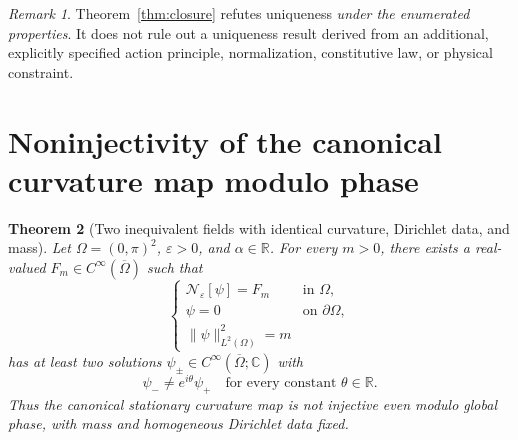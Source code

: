 \documentclass[11pt]{article}
\newtheorem{theorem}{Theorem}[section]
\theoremstyle{remark}
\newtheorem{remark}[theorem]{Remark}
\newcommand{\Ncurv}{\mathcal{N}_{\varepsilon}}
\newcommand{\R}{\mathbb{R}}
\newcommand{\C}{\mathbb{C}}
\begin{document}
\begin{remark}
Theorem~\ref{thm:closure} refutes uniqueness \emph{under the enumerated
properties}. It does not rule out a uniqueness result derived from an
additional, explicitly specified action principle, normalization,
constitutive law, or physical constraint.
\end{remark}

\section{Noninjectivity of the canonical curvature map modulo phase}

\begin{theorem}[Two inequivalent fields with identical curvature,
Dirichlet data, and mass]
\label{thm:stationary}
Let $\Omega=(0,\pi)^2$, $\varepsilon>0$, and $\alpha\in\R$.
For every $m>0$, there exists a real-valued
$F_m\in C^\infty(\overline\Omega)$ such that
\begin{equation}\label{eq:stationary-pde}
\begin{cases}
\Ncurv[\psi]=F_m&\text{in }\Omega,\\
\psi=0&\text{on }\partial\Omega,\\
\|\psi\|_{L^2(\Omega)}^2=m
\end{cases}
\end{equation}
has at least two solutions
$\psi_\pm\in C^\infty(\overline\Omega;\C)$ with
\[
\psi_-\neq e^{i\theta}\psi_+
\quad\text{for every constant }\theta\in\R.
\]
Thus the canonical stationary curvature map is not injective even
modulo global phase, with mass and homogeneous Dirichlet data fixed.
\end{theorem}
\end{document}
